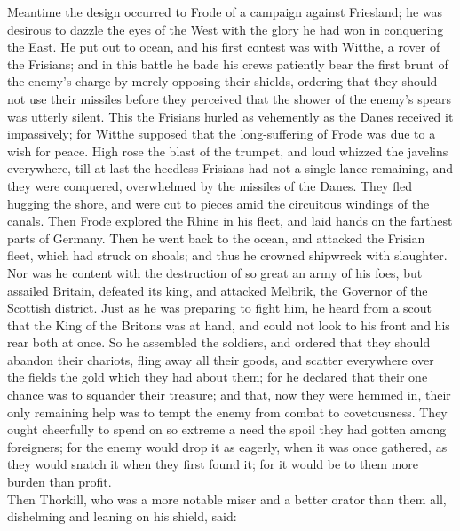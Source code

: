 \documentclass[10pt,a4paper]{report}
\begin{document}
Meantime the design occurred to Frode of a campaign against Friesland; he was desirous to dazzle the eyes of the West with the glory he had won in conquering the East. He put out to ocean, and his first contest was with Witthe, a rover of the Frisians; and in this battle he bade his crews patiently bear the first brunt of the enemy's charge by merely opposing their shields, ordering that they should not use their missiles before they perceived that the shower of the enemy's spears was utterly silent. This the Frisians hurled as vehemently as the Danes received it impassively; for Witthe supposed that the long-suffering of Frode was due to a wish for peace. High rose the blast of the trumpet, and loud whizzed the javelins everywhere, till at last the heedless Frisians had not a single lance remaining, and they were conquered, overwhelmed by the missiles of the Danes. They fled hugging the shore, and were cut to pieces amid the circuitous windings of the canals. Then Frode explored the Rhine in his fleet, and laid hands on the farthest parts of Germany. Then he went back to the ocean, and attacked the Frisian fleet, which had struck on shoals; and thus he crowned shipwreck with slaughter. Nor was he content with the destruction of so great an army of his foes, but assailed Britain, defeated its king, and attacked Melbrik, the Governor of the Scottish district. Just as he was preparing to fight him, he heard from a scout that the King of the Britons was at hand, and could not look to his front and his rear both at once. So he assembled the soldiers, and ordered that they should abandon their chariots, fling away all their goods, and scatter everywhere over the fields the gold which they had about them; for he declared that their one chance was to squander their treasure; and that, now they were hemmed in, their only remaining help was to tempt the enemy from combat to covetousness. They ought cheerfully to spend on so extreme a need the spoil they had gotten among foreigners; for the enemy would drop it as eagerly, when it was once gathered, as they would snatch it when they first found it; for it would be to them more burden than profit.\\

Then Thorkill, who was a more notable miser and a better orator than them all, dishelming and leaning on his shield, said:\\
\end{document}
